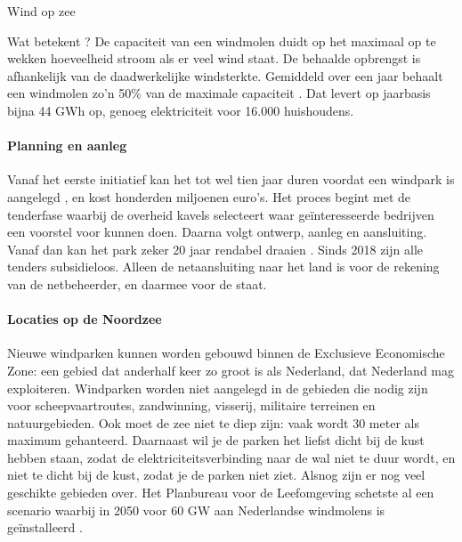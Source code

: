 \begin{voorstel}{Wind op zee}
\begin{multicols}{2}
\begin{overwegingen}
\begin{infobox}{Wat betekent ?}
De capaciteit van een windmolen duidt op het maximaal op te wekken hoeveelheid stroom als er veel wind staat. De behaalde opbrengst is afhankelijk van de daadwerkelijke windsterkte. Gemiddeld over een jaar behaalt een windmolen zo’n 50\% van de maximale capaciteit \parencite{lensink_kosten_2017}. Dat levert op jaarbasis bijna 44 GWh op, genoeg elektriciteit voor 16.000 huishoudens.
\end{infobox}

\paragraph{Planning en aanleg}
Vanaf het eerste initiatief kan het tot wel tien jaar duren voordat een windpark is aangelegd \parencite{westra_offshore_2014}, en kost honderden miljoenen euro’s. Het proces begint met de tenderfase waarbij de overheid kavels selecteert waar geïnteresseerde bedrijven een voorstel voor kunnen doen. Daarna volgt ontwerp, aanleg en aansluiting. Vanaf dan kan het park zeker 20 jaar rendabel draaien \parencite{lensink_kosten_2017}. Sinds 2018 zijn alle tenders subsidieloos. Alleen de netaansluiting naar het land is voor de rekening van de netbeheerder, en daarmee voor de staat.

\paragraph{Locaties op de Noordzee}
Nieuwe windparken kunnen worden gebouwd binnen de Exclusieve Economische Zone: een gebied dat anderhalf keer zo groot is als Nederland, dat Nederland mag exploiteren. Windparken worden niet aangelegd in de gebieden die nodig zijn voor scheepvaartroutes, zandwinning, visserij, militaire terreinen en natuurgebieden. Ook moet de zee niet te diep zijn: vaak wordt 30 meter als maximum gehanteerd. Daarnaast wil je de parken het liefst dicht bij de kust hebben staan, zodat de elektriciteitsverbinding naar de wal niet te duur wordt, en niet te dicht bij de kust, zodat je de parken niet ziet. Alsnog zijn er nog veel geschikte gebieden over. Het Planbureau voor de Leefomgeving schetste al een scenario waarbij in 2050 voor 60 GW aan Nederlandse windmolens is geïnstalleerd \parencite{matthijsen_toekomst_2018}.


\end{overwegingen}
\end{multicols}
\end{voorstel}
